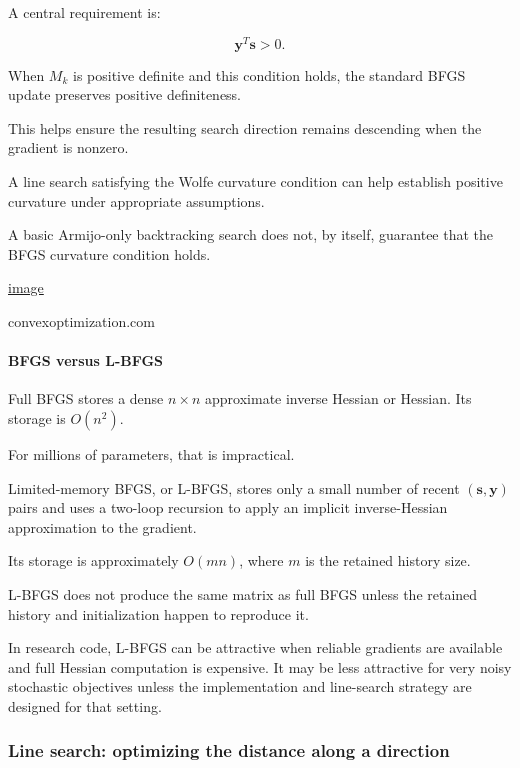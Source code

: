 A central requirement is:

\[
\boxed{\mathbf y^T\mathbf s>0}.
\]

When \(M_k\) is positive definite and this condition holds, the standard BFGS update preserves positive definiteness.

This helps ensure the resulting search direction remains descending when the gradient is nonzero.

A line search satisfying the Wolfe curvature condition can help establish positive curvature under appropriate assumptions.

A basic Armijo-only backtracking search does not, by itself, guarantee that the BFGS curvature condition holds. 

\href{https://www.google.com/s2/favicons?domain=https://convexoptimization.com&sz=32}{image}

convexoptimization.com

\paragraph{BFGS versus L-BFGS}\label{02-foundations-ii-ch026-bfgs-versus-l-bfgs}

\hypertarget{02-foundations-ii-ch026-bfgs-versus-l-bfgs}{}

Full BFGS stores a dense \(n\times n\) approximate inverse Hessian or Hessian. Its storage is \(O(n^2)\).

For millions of parameters, that is impractical.

Limited-memory BFGS, or L-BFGS, stores only a small number of recent \((\mathbf s,\mathbf y)\) pairs and uses a two-loop recursion to apply an implicit inverse-Hessian approximation to the gradient.

Its storage is approximately \(O(mn)\), where \(m\) is the retained history size.

L-BFGS does not produce the same matrix as full BFGS unless the retained history and initialization happen to reproduce it.

In research code, L-BFGS can be attractive when reliable gradients are available and full Hessian computation is expensive. It may be less attractive for very noisy stochastic objectives unless the implementation and line-search strategy are designed for that setting.

\subsubsection{Line search: optimizing the distance along a direction}\label{02-foundations-ii-ch026-line-search-optimizing-the-distance-along-a-direction}

